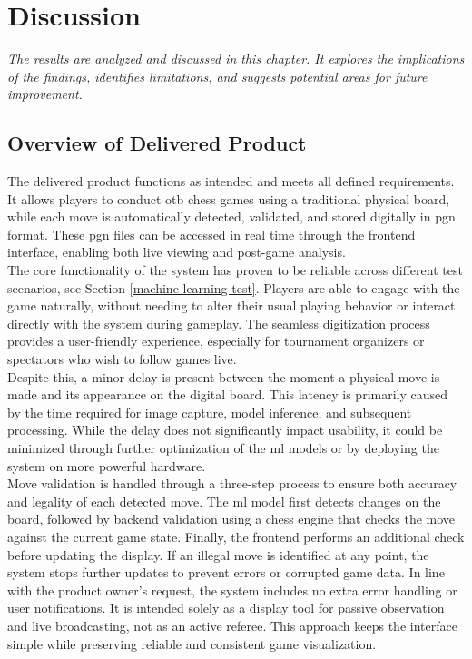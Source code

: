 \chapter{Discussion}

\begin{center}
    \textit{The results are analyzed and discussed in this chapter. It explores the implications of the findings, identifies limitations, and suggests potential areas for future improvement.}
\end{center}

\section{Overview of Delivered Product}
The delivered product functions as intended and meets all defined requirements. It allows players to conduct \gls{otb} chess games using a traditional physical board, while each move is automatically detected, validated, and stored digitally in \gls{pgn} format. These \gls{pgn} files can be accessed in real time through the frontend interface, enabling both live viewing and post-game analysis. \\

The core functionality of the system has proven to be reliable across different test scenarios, see Section \ref{machine-learning-test}. Players are able to engage with the game naturally, without needing to alter their usual playing behavior or interact directly with the system during gameplay. The seamless digitization process provides a user-friendly experience, especially for tournament organizers or spectators who wish to follow games live. \\

Despite this, a minor delay is present between the moment a physical move is made and its appearance on the digital board. This latency is primarily caused by the time required for image capture, model inference, and subsequent processing. While the delay does not significantly impact usability, it could be minimized through further optimization of the \gls{ml} models or by deploying the system on more powerful hardware. \\

Move validation is handled through a three-step process to ensure both accuracy and legality of each detected move. The \gls{ml} model first detects changes on the board, followed by backend validation using a chess engine that checks the move against the current game state. Finally, the frontend performs an additional check before updating the display. If an illegal move is identified at any point, the system stops further updates to prevent errors or corrupted game data. In line with the product owner's request, the system includes no extra error handling or user notifications. It is intended solely as a display tool for passive observation and live broadcasting, not as an active referee. This approach keeps the interface simple while preserving reliable and consistent game visualization.

